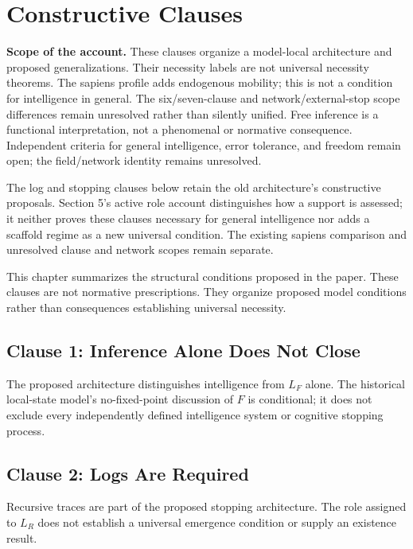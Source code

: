 \section{Constructive Clauses}

\noindent\textbf{Scope of the account.} These clauses organize a model-local architecture and proposed generalizations. Their necessity labels are not universal necessity theorems. The sapiens profile adds endogenous mobility; this is not a condition for intelligence in general. The six/seven-clause and network/external-stop scope differences remain unresolved rather than silently unified. Free inference is a functional interpretation, not a phenomenal or normative consequence. Independent criteria for general intelligence, error tolerance, and freedom remain open; the field/network identity remains unresolved.

The log and stopping clauses below retain the old architecture's constructive proposals. Section 5's active role account distinguishes how a support is assessed; it neither proves these clauses necessary for general intelligence nor adds a scaffold regime as a new universal condition. The existing sapiens comparison and unresolved clause and network scopes remain separate.


This chapter summarizes the structural conditions proposed in the paper. These clauses are not normative prescriptions. They organize proposed model conditions rather than consequences establishing universal necessity.

\subsection{Clause 1: Inference Alone Does Not Close}

The proposed architecture distinguishes intelligence from $L_F$ alone. The historical local-state model's no-fixed-point discussion of $F$ is conditional; it does not exclude every independently defined intelligence system or cognitive stopping process.

\subsection{Clause 2: Logs Are Required}

Recursive traces are part of the proposed stopping architecture. The role assigned to $L_R$ does not establish a universal emergence condition or supply an existence result.

